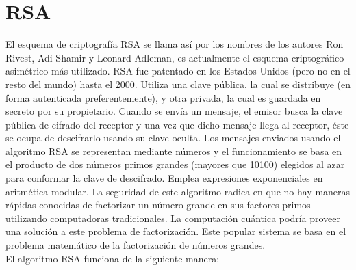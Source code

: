 



\section{RSA}

El esquema de criptografía RSA se llama así por los nombres de los autores Ron Rivest, Adi Shamir y Leonard Adleman, es actualmente el esquema criptográfico asimétrico más utilizado. RSA fue patentado en los Estados Unidos (pero no en el resto del mundo) hasta el 2000. Utiliza una clave pública, la cual se distribuye (en forma autenticada preferentemente), y otra privada, la cual es guardada en secreto por su propietario. Cuando se envía un mensaje, el emisor busca la clave pública de cifrado del receptor y una vez que dicho mensaje llega al receptor, éste se ocupa de descifrarlo usando su clave oculta. Los mensajes enviados usando el algoritmo RSA se representan mediante números y el funcionamiento se basa en el producto de dos números primos grandes (mayores que 10100) elegidos al azar para conformar la clave de descifrado. Emplea expresiones exponenciales en aritmética modular. La seguridad de este algoritmo radica en que no hay maneras rápidas conocidas de factorizar un número grande en sus factores primos utilizando computadoras tradicionales.
La computación cuántica podría proveer una solución a este problema de factorización. Este popular sistema se basa en el problema matemático de la factorización de números grandes. \\
El algoritmo RSA funciona de la siguiente manera: \\


